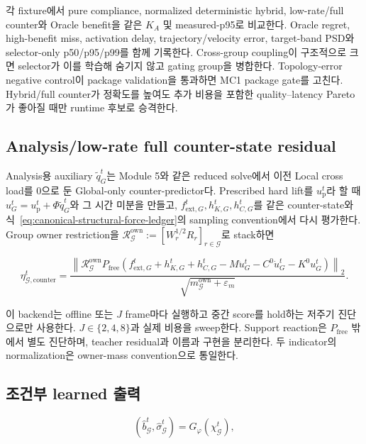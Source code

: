 \documentclass[11pt,a4paper]{article}
\newcommand{\eps}{\varepsilon}
\begin{document}
각 fixture에서 pure compliance, normalized deterministic hybrid, low-rate/full counter와 Oracle benefit을
같은 \(K_A\) 및 measured-p95로 비교한다. Oracle regret, high-benefit miss, activation delay,
trajectory/velocity error, target-band PSD와 selector-only p50/p95/p99를 함께 기록한다.
Cross-group coupling이 구조적으로 크면 selector가 이를 학습해 숨기지 않고 gating group을 병합한다.
Topology-error negative control이 package validation을 통과하면 MC1 package gate를 고친다.
Hybrid/full counter가 정확도를 높여도 추가 비용을 포함한 quality--latency Pareto가 좋아질 때만
runtime 후보로 승격한다.

\subsection*{Analysis/low-rate full counter-state residual}

Analysis용 auxiliary \(\widetilde q_G^t\)는 Module 5와 같은 reduced solve에서
이전 Local cross load를 0으로 둔 Global-only counter-predictor다.
Prescribed hard lift를 \(u_{\mathrm p}^t\)라 할 때
\(u_G^t=u_{\mathrm p}^t+\Phi\widetilde q_G^t\)와 그 시간 미분을 만들고,
\(f_{\mathrm{ext},G}^t,h_{K,G}^t,h_{C,G}^t\)를 같은 counter-state와
식~\eqref{eq:canonical-structural-force-ledger}의 sampling convention에서 다시 평가한다.
Group owner restriction을
\(\mathcal R_{\mathcal G}^{\mathrm{own}}
:=[W_r^{1/2}R_r]_{r\in\mathcal G}\)로 stack하면

\begin{equation}
  \eta_{\mathcal G,\mathrm{counter}}^t
  =
  \frac{
  \left\|
  \mathcal R_{\mathcal G}^{\mathrm{own}}P_{\mathrm{free}}
  \left(
    f_{\mathrm{ext},G}^t+h_{K,G}^t+h_{C,G}^t
    -M\ddot u_G^t-C^0\dot u_G^t-K^0u_G^t
  \right)
  \right\|_2
  }{
  \sqrt{m_{\mathcal G}^{\mathrm{own}}+\eps_m}
  }.
  \label{eq:full-counter-state-residual}
\end{equation}

이 backend는 offline 또는 \(J\) frame마다 실행하고 중간 score를 hold하는 저주기 진단으로만 사용한다.
\(J\in\{2,4,8\}\)과 실제 비용을 sweep한다. Support reaction은 \(P_{\mathrm{free}}\) 밖에서 별도 진단하며,
teacher residual과 이름과 구현을 분리한다. 두 indicator의 normalization은 owner-mass convention으로 통일한다.

\subsection*{조건부 learned 출력}

\begin{equation}
  (\widehat b_{\mathcal G}^t,\widehat\sigma_{\mathcal G}^t)
  =
  G_\varphi(\chi_{\mathcal G}^t),
\end{equation}
\end{document}
